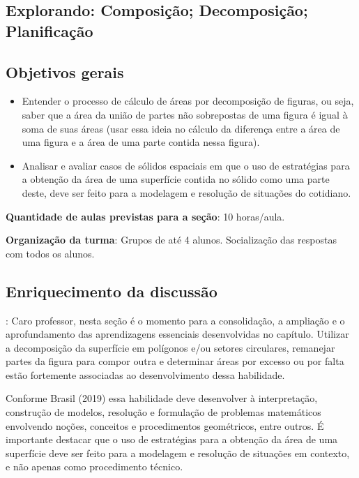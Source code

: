 \begin{paginatexto}
{
\section{Explorando: Composição; Decomposição; Planificação}
\subsection{Objetivos gerais}
\begin{itemize}
\item Entender o processo de cálculo de áreas por decomposição de figuras, ou seja, saber que a área da união de partes não sobrepostas de uma figura é igual à soma de suas áreas (usar essa ideia no cálculo da diferença entre a área de uma figura e a área de uma parte contida nessa figura).
\item Analisar e avaliar casos de sólidos espaciais em que o uso de estratégias para a obtenção da área de uma superfície contida no sólido como uma parte deste, deve ser feito para a modelagem e resolução de situações do cotidiano.
\end{itemize}

\textbf{Quantidade de aulas previstas para a seção}: 10 horas/aula.

\textbf{Organização da turma}: Grupos de até 4 alunos. Socialização das respostas com todos os alunos.

\subsection{Enriquecimento da discussão}: Caro professor, nesta seção é o momento para a consolidação, a ampliação e o aprofundamento das aprendizagens essenciais desenvolvidas no capítulo. Utilizar a decomposição da superfície em polígonos e/ou setores circulares, remanejar partes da figura para compor outra e determinar áreas por excesso ou por falta estão fortemente associadas ao desenvolvimento dessa habilidade. 

Conforme Brasil (2019) essa habilidade deve desenvolver à interpretação, construção de modelos, resolução e formulação de problemas matemáticos envolvendo noções, conceitos e procedimentos geométricos, entre outros. É importante destacar que o uso de estratégias para a obtenção da área de uma superfície deve ser feito para a modelagem e resolução de situações em contexto, e não apenas como procedimento técnico.

}
\end{paginatexto}

